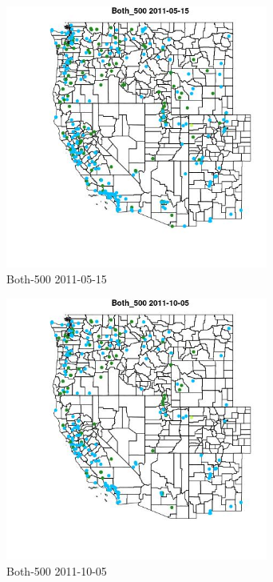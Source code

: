 \begin{figure} 
\centering  
\includegraphics[width=0.77\textwidth]{Code_Outputs/ML_input_report_ML_input_PM25_Step5_part_d_de_duplicated_aves_ML_input_MapObsBoth_5002011-05-15.jpg} 
\caption{\label{fig:ML_input_report_ML_input_PM25_Step5_part_d_de_duplicated_aves_ML_inputMapObsBoth_5002011-05-15}Both-500 2011-05-15} 
\end{figure} 
 

\begin{figure} 
\centering  
\includegraphics[width=0.77\textwidth]{Code_Outputs/ML_input_report_ML_input_PM25_Step5_part_d_de_duplicated_aves_ML_input_MapObsBoth_5002011-10-05.jpg} 
\caption{\label{fig:ML_input_report_ML_input_PM25_Step5_part_d_de_duplicated_aves_ML_inputMapObsBoth_5002011-10-05}Both-500 2011-10-05} 
\end{figure} 
 

